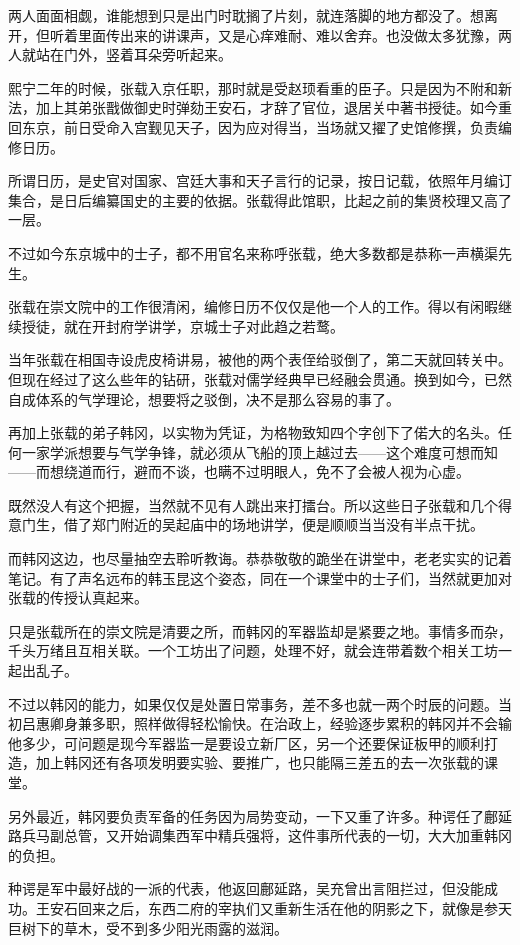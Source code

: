 两人面面相觑，谁能想到只是出门时耽搁了片刻，就连落脚的地方都没了。想离开，但听着里面传出来的讲课声，又是心痒难耐、难以舍弃。也没做太多犹豫，两人就站在门外，竖着耳朵旁听起来。

熙宁二年的时候，张载入京任职，那时就是受赵顼看重的臣子。只是因为不附和新法，加上其弟张戬做御史时弹劾王安石，才辞了官位，退居关中著书授徒。如今重回东京，前日受命入宫觐见天子，因为应对得当，当场就又擢了史馆修撰，负责编修日历。

所谓日历，是史官对国家、宫廷大事和天子言行的记录，按日记载，依照年月编订集合，是日后编纂国史的主要的依据。张载得此馆职，比起之前的集贤校理又高了一层。

不过如今东京城中的士子，都不用官名来称呼张载，绝大多数都是恭称一声横渠先生。

张载在崇文院中的工作很清闲，编修日历不仅仅是他一个人的工作。得以有闲暇继续授徒，就在开封府学讲学，京城士子对此趋之若鹜。

当年张载在相国寺设虎皮椅讲易，被他的两个表侄给驳倒了，第二天就回转关中。但现在经过了这么些年的钻研，张载对儒学经典早已经融会贯通。换到如今，已然自成体系的气学理论，想要将之驳倒，决不是那么容易的事了。

再加上张载的弟子韩冈，以实物为凭证，为格物致知四个字创下了偌大的名头。任何一家学派想要与气学争锋，就必须从飞船的顶上越过去——这个难度可想而知——而想绕道而行，避而不谈，也瞒不过明眼人，免不了会被人视为心虚。

既然没人有这个把握，当然就不见有人跳出来打擂台。所以这些日子张载和几个得意门生，借了郑门附近的吴起庙中的场地讲学，便是顺顺当当没有半点干扰。

而韩冈这边，也尽量抽空去聆听教诲。恭恭敬敬的跪坐在讲堂中，老老实实的记着笔记。有了声名远布的韩玉昆这个姿态，同在一个课堂中的士子们，当然就更加对张载的传授认真起来。

只是张载所在的崇文院是清要之所，而韩冈的军器监却是紧要之地。事情多而杂，千头万绪且互相关联。一个工坊出了问题，处理不好，就会连带着数个相关工坊一起出乱子。

不过以韩冈的能力，如果仅仅是处置日常事务，差不多也就一两个时辰的问题。当初吕惠卿身兼多职，照样做得轻松愉快。在治政上，经验逐步累积的韩冈并不会输他多少，可问题是现今军器监一是要设立新厂区，另一个还要保证板甲的顺利打造，加上韩冈还有各项发明要实验、要推广，也只能隔三差五的去一次张载的课堂。

另外最近，韩冈要负责军备的任务因为局势变动，一下又重了许多。种谔任了鄜延路兵马副总管，又开始调集西军中精兵强将，这件事所代表的一切，大大加重韩冈的负担。

种谔是军中最好战的一派的代表，他返回鄜延路，吴充曾出言阻拦过，但没能成功。王安石回来之后，东西二府的宰执们又重新生活在他的阴影之下，就像是参天巨树下的草木，受不到多少阳光雨露的滋润。


